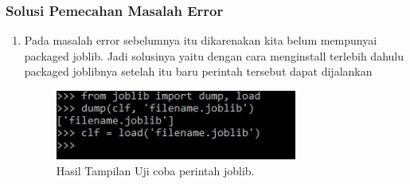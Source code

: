 \subsubsection{Solusi Pemecahan Masalah Error}
\begin{enumerate}
\item Pada masalah error sebelumnya itu dikarenakan kita belum mempunyai packaged joblib. Jadi solusinya yaitu dengan cara menginstall terlebih dahulu packaged joblibnya setelah itu baru perintah tersebut dapat dijalankan

\begin{figure}[ht]\centerline{\includegraphics[width=0.75\textwidth]{figures/32.JPG}}\caption{Hasil Tampilan Uji coba perintah joblib.}\end{figure}
\end{enumerate}




